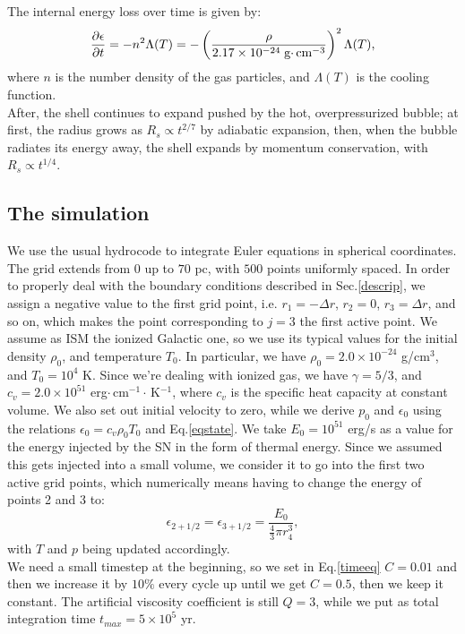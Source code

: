 \documentclass{article}
\begin{document}
The internal energy loss over time is given by:
\begin{equation}\label{dedt}
	\pdv{\epsilon}{t}= -n^2\Lambda(T)=-\left(\frac{\rho}{2.17\times 10^{-24}\;\text{g$\cdot\,$cm}^{-3}}\right)^2\Lambda(T),
\end{equation}
where $n$ is the number density of the gas particles, and $\Lambda(T)$ is the cooling function. \\
After, the shell continues to expand pushed by the hot, overpressurized bubble; at first, the radius grows as $R_s\propto t^{2/7}$ by adiabatic expansion, then, when the bubble radiates its energy away, the shell expands by momentum conservation, with $R_s\propto t^{1/4}$.

\subsection{The simulation}
We use the usual hydrocode to integrate Euler equations in spherical coordinates. The grid extends from $0$ up to $70$ pc, with $500$ points uniformly spaced. In order to properly deal with the boundary conditions described in Sec.\ref{descrip}, we assign a negative value to the first grid point, i.e. $r_1=-\Delta r$, $r_2=0$, $r_3=\Delta r$, and so on, which makes the point corresponding to $j=3$ the first active point. 
We assume as ISM the ionized Galactic one, so we use its typical values for the initial density $\rho_0$, and temperature $T_0$. In particular, we have $\rho_0=2.0\times 10^{-24}$ g/cm$^{3}$, and $T_0=10^4$ K. Since we're dealing with ionized gas, we have $\gamma =5/3$, and $c_v=2.0\times 10^{51}$ erg$\cdot\,$cm$^{-1}\cdot\,$K$^{-1}$, where $c_v$ is the specific heat capacity at constant volume. We also set out initial velocity to zero, while we derive $p_0$ and $\epsilon_0$ using the relations $\epsilon_0=c_v\rho_0T_0$ and Eq.\eqref{eqstate}. We take $E_0=10^{51}$ erg/s as a value for the energy injected by the SN in the form of thermal energy. Since we assumed this gets injected into a small volume, we consider it to go into the first two active grid points, which numerically means having to change the energy of points 2 and 3 to:
\begin{equation}
	\epsilon_{2+1/2}=\epsilon_{3+1/2}=\frac{E_0}{\frac{4}{3}\pi r_4^3},
\end{equation}
with $T$ and $p$ being updated accordingly.\\
We need a small timestep at the beginning, so we set in Eq.\eqref{timeeq} $C=0.01$ and then we increase it by $10\%$ every cycle up until we get $C=0.5$, then we keep it constant. The artificial viscosity coefficient is still $Q=3$, while we put as total integration time $t_{max}=5\times 10^5$ yr. 
\end{document}

